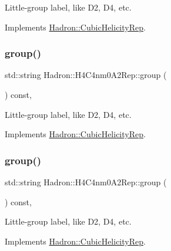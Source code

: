Little-\/group label, like D2, D4, etc. 

Implements \mbox{\hyperlink{structHadron_1_1CubicHelicityRep_a101a7d76cd8ccdad0f272db44b766113}{Hadron\+::\+Cubic\+Helicity\+Rep}}.

\mbox{\label{structHadron_1_1H4C4nm0A2Rep_a9424437b4e8f2230697222a77fe7b3e0}} 
\subsubsection{\texorpdfstring{group()}{group()}\hspace{0.1cm}{\footnotesize\ttfamily [3/5]}}
{\footnotesize\ttfamily std\+::string Hadron\+::\+H4\+C4nm0\+A2\+Rep\+::group (\begin{DoxyParamCaption}{ }\end{DoxyParamCaption}) const\hspace{0.3cm}{\ttfamily [inline]}, {\ttfamily [virtual]}}

Little-\/group label, like D2, D4, etc. 

Implements \mbox{\hyperlink{structHadron_1_1CubicHelicityRep_a101a7d76cd8ccdad0f272db44b766113}{Hadron\+::\+Cubic\+Helicity\+Rep}}.

\mbox{\label{structHadron_1_1H4C4nm0A2Rep_a9424437b4e8f2230697222a77fe7b3e0}} 
\subsubsection{\texorpdfstring{group()}{group()}\hspace{0.1cm}{\footnotesize\ttfamily [4/5]}}
{\footnotesize\ttfamily std\+::string Hadron\+::\+H4\+C4nm0\+A2\+Rep\+::group (\begin{DoxyParamCaption}{ }\end{DoxyParamCaption}) const\hspace{0.3cm}{\ttfamily [inline]}, {\ttfamily [virtual]}}

Little-\/group label, like D2, D4, etc. 

Implements \mbox{\hyperlink{structHadron_1_1CubicHelicityRep_a101a7d76cd8ccdad0f272db44b766113}{Hadron\+::\+Cubic\+Helicity\+Rep}}.

